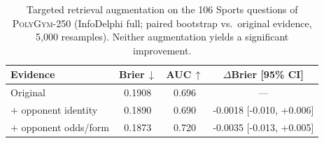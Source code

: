 \begin{table}[t]
\centering
\small
\caption{Targeted retrieval augmentation on the 106 Sports questions of \textsc{PolyGym}-250 (InfoDelphi full; paired bootstrap vs.\ original evidence, 5{,}000 resamples). Neither augmentation yields a significant improvement.}
\label{tab:sports}
\begin{tabular}{lccc}
\toprule
Evidence & Brier$\,\downarrow$ & AUC$\,\uparrow$ & $\Delta$Brier [95\% CI] \\
\midrule
Original & 0.1908 & 0.696 & --- \\
$+$ opponent identity & 0.1890 & 0.690 & -0.0018 [-0.010, +0.006] \\
$+$ opponent odds/form & 0.1873 & 0.720 & -0.0035 [-0.013, +0.005] \\
\bottomrule
\end{tabular}
\end{table}
